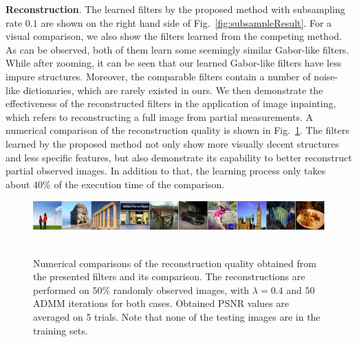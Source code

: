 {\bfseries Reconstruction}. The learned filters by the proposed method with subsampling rate $0.1$ are shown on the right hand side of Fig.~\ref{fig:subsampleResult}. For a visual comparison, we also show the filters learned from the competing method. As can be observed, both of them learn some seemingly similar Gabor-like filters. While after zooming, it can be seen that our learned Gabor-like filters have less impure structures. Moreover, the comparable filters contain a number of noise-like dictionaries, which are rarely existed in ours. We then demonstrate the effectiveness of the reconstructed filters in the application of image inpainting, which refers to reconstructing a full image from partial measurements. A numerical comparison of the reconstruction quality is shown in Fig.~\ref{fig:PSNRrecon}. The filters learned by the proposed method not only show more visually decent structures and less specific features, but also demonstrate its capability to better reconstruct partial observed images. In addition to that, the learning process only takes about $40\%$ of the execution time of the comparison.

\begin{figure}[h]
    \includegraphics[width=1\textwidth]{figure/reconImage.pdf}
    \\
    \\
    \caption{Numerical comparisons of the reconstruction quality obtained from the presented filters and its comparison. The reconstructions are performed on $50\%$ randomly observed images, with $\lambda = 0.4$ and $50$ ADMM iterations for both cases. Obtained PSNR values are averaged on 5 trials. Note that none of the testing images are in the training sets.} \label{fig:PSNRrecon}
\end{figure}

